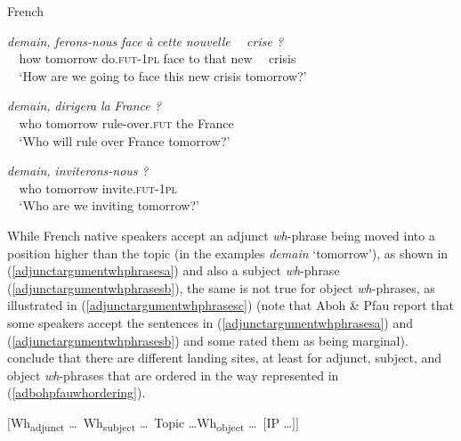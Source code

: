 \begin{exe}
\ex French \citep[101]{aboh2010sa}\label{adjunctargumentwhphrases}\begin{xlist}
\ex {} {\textit{demain,}} {\textit{ferons-nous}} {\textit{face}} {\textit{à}} {\textit{cette}} {\textit{nouvelle}} {\textcolor{white}{\cmark /?}\textit{crise ?}} \\
{\textcolor{white}{\cmark /?}how} {tomorrow} {do.\textsc{fut}-\textsc{1pl}} {face} {to} {that} {new} {\textcolor{white}{\cmark /?}crisis}\\
\trans \textcolor{white}{\cmark /?}`How are we going to face this new crisis tomorrow?' \label{adjunctargumentwhphrasesa}

\ex {} {\textit{demain,}} {\textit{dirigera}} {\textit{la}} {\textit{France ?}}  \\
{\textcolor{white}{\cmark /?}who} {tomorrow} {rule-over.\textsc{fut}} {the} {France}\\
\trans \textcolor{white}{\cmark /?}`Who will rule over France tomorrow?'\label{adjunctargumentwhphrasesb}

\ex {} {\textit{demain,}} {\textit{inviterons-nous ?}}   \\
{\textcolor{white}{\cmark /?}who} {tomorrow} {invite.\textsc{fut}-\textsc{1pl}} \\
\trans \textcolor{white}{\cmark /?}`Who are we inviting tomorrow?'\label{adjunctargumentwhphrasesc}

\end{xlist}
\end{exe}

\noindent While French native speakers accept an adjunct \textit{wh}-phrase being moved into a position higher than the topic (in the examples \textit{demain} `tomorrow'), as shown in (\ref{adjunctargumentwhphrasesa}) and also a subject \textit{wh}-phrase (\ref{adjunctargumentwhphrasesb}), the same is not true for object \textit{wh}-phrases, as illustrated in (\ref{adjunctargumentwhphrasesc}) (note that Aboh \& Pfau report that some speakers accept the sentences in (\ref{adjunctargumentwhphrasesa}) and (\ref{adjunctargumentwhphrasesb}) and some rated them as being marginal). \citet[102]{aboh2010sa} conclude that there are different landing sites, at least for adjunct, subject, and object \textit{wh}-phrases that are ordered in the way represented in (\ref{adbohpfauwhordering}).

\newpage
\begin{exe}
\ex $[$Wh\textsubscript{adjunct} \dots\ Wh\textsubscript{subject} \dots\ Topic \dots Wh\textsubscript{object} \dots\  $[$IP \dots $]$$]$ \label{adbohpfauwhordering}
\end{exe}

